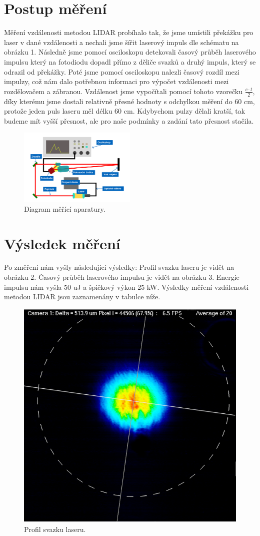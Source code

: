 \documentclass[12pt,a4paper]{article}
\begin{document}
\section{Postup měření}
Měření vzdálenosti metodou LIDAR probíhalo tak, že jsme umístili překážku pro laser v dané vzdálenosti a nechali jsme šířit laserový impuls dle schématu na obrázku 1. Následně jsme pomocí osciloskopu detekovali časový průběh laserového impulsu který na fotodiodu dopadl přímo z děliče svazků a druhý impuls, který se odrazil od překážky. Poté jsme pomocí osciloskopu nalezli časový rozdíl mezi impulzy, což nám dalo potřebnou informaci pro výpočet vzdálenosti mezi rozdělovačem a zábranou. Vzdálenost jsme vypočítali pomocí tohoto vzorečku $\frac{c \cdot t}{2}$, díky kterému jsme dostali relativně přesné hodnoty s odchylkou měření do 60 cm, protože jeden puls laseru měl délku 60 cm. Kdybychom pulzy dělali kratší, tak budeme mít vyšší přesnost, ale pro naše podmínky a zadání tato přesnost stačila.
\begin{figure}[h]
    \centering
    \includegraphics[width=0.5\textwidth]{Diagram měření.png}
    \caption{Diagram měřící aparatury.}
\end{figure}

\pagebreak
\section{Výsledek měření}
Po změření nám vyšly následující výsledky:
Profil svazku laseru je vidět na obrázku 2. 
Časový průběh laserového impulsu je vidět na obrázku 3.
Energie impulsu nám vyšla 50 uJ a špičkový výkon 25 kW.
Výsledky měření vzdálenosti metodou LIDAR jsou zaznamenány v tabulce níže.


\begin{figure}[h!]
    \centering
    \includegraphics[width=0.3
    \textwidth]{profil.png}
    \caption{Profil svazku laseru.}
\end{figure}
\end{document}
